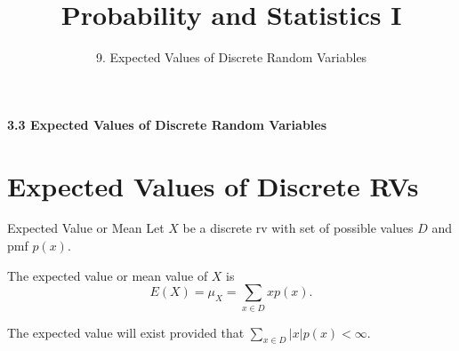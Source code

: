 


\newcommand{\lecturenum}{9}

\title[SS2857]{Probability and Statistics I}
\subtitle{\lecturenum. Expected Values of Discrete Random Variables}

\date{}






{

\begin{frame}
  \addtocounter{framenumber}{-1}

  \maketitle
\end{frame}
}

\begin{frame}
  \frametitle{}

  \begin{center}
    \Large{\textbf{3.3 Expected Values of Discrete Random Variables}}
  \end{center}

  \begin{center}


  \end{center}
\end{frame}



\section{Expected Values of Discrete RVs}

\begin{frame}
  \begin{block}{Expected Value or Mean}
    Let $X$ be a discrete rv with set of possible values $D$ and pmf $p(x)$. 
    
    \medskip
    
    The expected value or mean value of $X$ is
    \[
      E(X)=\mu_X=\sum_{x\in D} xp(x).
    \]
    
    \medskip
    
    The expected value will exist provided that $\sum_{x\in D} |x|p(x) < \infty$. 

  \end{block}


\end{frame}

